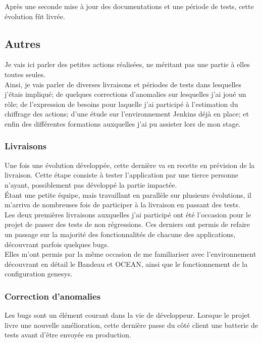 \documentclass{rapport}
\begin{document}
Après une seconde mise à jour des documentations et une période de tests, cette évolution fût livrée.\\

\newpage
\subsection{Autres}
Je vais ici parler des petites actions réalisées, ne méritant pas une partie à elles toutes seules.\\
Ainsi, je vais parler de diverses livraisons et périodes de tests dans lesquelles j'étais impliqué; de quelques corrections d'anomalies sur lesquelles j'ai joué un rôle; de l'expression de besoins pour laquelle j'ai participé à l'estimation du chiffrage des actions; d'une étude sur l'environnement Jenkins déjà en place; et enfin des différentes formations auxquelles j'ai pu assister lors de mon stage.

\subsubsection{Livraisons}

Une fois une évolution développée, cette dernière va en recette en prévision de la livraison. Cette étape consiste à tester l'application par une tierce personne n'ayant, possiblement pas développé la partie impactée.\\
Étant une petite équipe, mais travaillant en parallèle sur plusieurs évolutions, il m'arriva de nombreuses fois de participer à la livraison en passant des tests.\\

Les deux premières livraisons auxquelles j'ai participé ont été l'occasion pour le projet de passer des tests de non régressions. Ces derniers ont permis de refaire un passage sur la majorité des fonctionnalités de chacune des applications, découvrant parfois quelques bugs. \\
Elles m'ont permis par la même occasion de me familiariser avec l'environnement découvrant en détail le Bandeau et OCEAN, ainsi que le fonctionnement de la configuration genesys.

\subsubsection{Correction d'anomalies}

Les bugs sont un élément courant dans la vie de développeur. Lorsque le projet livre une nouvelle amélioration, cette dernière passe du côté client une batterie de tests avant d'être envoyée en production.\\
\end{document}
